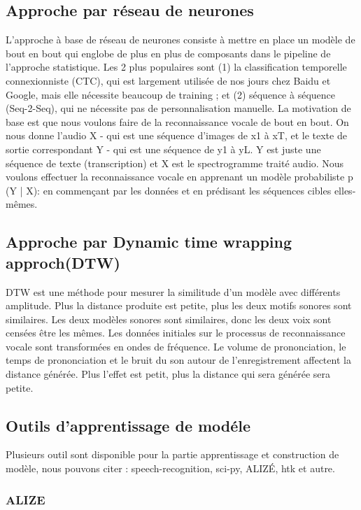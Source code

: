 \documentclass[a4paper, 12pt]{book}
\begin{document}
\subsection{Approche par réseau de neurones}

L'approche à base de réseau de neurones consiste à mettre en place un modèle de bout en bout qui englobe de plus en plus de composants dans le pipeline de l'approche statistique. Les 2 plus populaires sont (1) la classification temporelle connexionniste (CTC), qui est largement utilisée de nos jours chez Baidu et Google, mais elle nécessite beaucoup de training ; et (2) séquence à séquence (Seq-2-Seq), qui ne nécessite pas de personnalisation manuelle.
La motivation de base est que nous voulons faire de la reconnaissance vocale de bout en bout. On nous donne l'audio X - qui est une séquence d'images de x1 à xT, et le texte de sortie correspondant Y - qui est une séquence de y1 à yL. Y est juste une séquence de texte (transcription) et X est le spectrogramme traité audio. Nous voulons effectuer la reconnaissance vocale en apprenant un modèle probabiliste p (Y | X): en commençant par les données et en prédisant les séquences cibles elles-mêmes.


\subsection{Approche par Dynamic time wrapping approch(DTW)}
DTW est une méthode pour mesurer la similitude d'un modèle avec différents amplitude. Plus la distance produite est petite, plus les deux motifs sonores sont similaires. Les deux modèles sonores sont similaires, donc les deux voix sont censées être les mêmes. Les données initiales sur le processus de reconnaissance vocale sont transformées en ondes de fréquence. Le volume de prononciation, le temps de prononciation et le bruit du son autour de l'enregistrement affectent la distance générée. Plus l'effet est petit, plus la distance qui sera générée sera petite.

\subsection{Outils d'apprentissage de modéle}
Plusieurs outil sont disponible pour la partie apprentissage et construction de modèle, nous pouvons citer : speech-recognition, sci-py, ALIZÉ, htk et autre.

\subsubsection{ALIZE}
\end{document}

